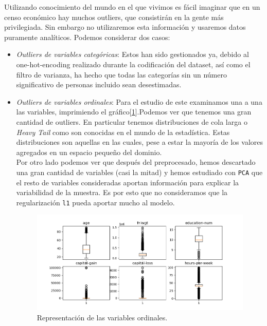 \documentclass[11pt,a4paper]{article}
\begin{document}
\begin{itemize}
  Utilizando conocimiento del mundo en el que vivimos es fácil imaginar que en un censo económico hay muchos outliers, que consistirán en la gente más privilegiada. Sin embargo no utilizaremos esta información y usaremos datos puramente analíticos. Podemos considerar dos casos:
  \begin{itemize}
  \item \emph{Outliers de variables categóricas}: Estos han sido gestionados ya, debido al one-hot-encoding realizado durante la codificación del dataset, así como el filtro de varianza, ha hecho que todas las categorías sin un número significativo de personas incluido sean desestimadas.
  \item \emph{Outliers de variables ordinales}: Para el estudio de este examinamos una a una las variables, imprimiendo el gráfico[\ref{fig:outliers}].Podemos ver que tenemos una gran cantidad de outliers. En particular tenemos distribuciones de cola larga o \emph{Heavy Tail} como son conocidas en el mundo de la estadística. Estas distribuciones son aquellas en las cuales, pese a estar la mayoría de los valores agregados en un espacio pequeño del dominio.\\

    Por otro lado podemos ver que después del preprocesado, hemos descartado una gran cantidad de variables (casi la mitad) y hemos estudiado con \texttt{PCA} que el resto de variables consideradas aportan información para explicar la variabilidad de la muestra. Es por esto que no consideramos que la regularización \texttt{l1} pueda aportar mucho al modelo.\newpage

    \begin{figure}[h!]    
      \centering
      \includegraphics[width=\textwidth]{./figures/outliers.png}
      \caption{Representación de las variables ordinales. }
      \label{fig:outliers}
    \end{figure}


\end{itemize}
\end{itemize}
\end{document}
